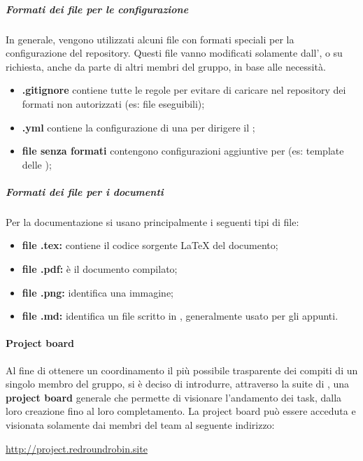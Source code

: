 		\subparagraph{Formati dei file per le configurazione}

		In generale, vengono utilizzati alcuni file con formati speciali per la configurazione del repository. Questi file vanno modificati solamente dall', o su richiesta, anche da parte di altri membri del gruppo, in base alle necessità.
		\begin{itemize}
			\item \textbf{.gitignore} contiene tutte le regole per evitare di caricare nel repository dei formati non autorizzati (es: file eseguibili);
			\item \textbf{.yml} contiene la configurazione di una  per dirigere il ;
			\item \textbf{file senza formati} contengono configurazioni aggiuntive per  (es: template delle );
		\end{itemize}

		\subparagraph{Formati dei file per i documenti}

		Per la documentazione si usano principalmente i seguenti tipi di file:
		\begin{itemize}
			\item \textbf{file .tex:} contiene il codice sorgente \LaTeX{} del documento;
			\item \textbf{file .pdf:} è il documento compilato;
			\item \textbf{file .png:} identifica una immagine;
			\item \textbf{file .md:} identifica un file scritto in , generalmente usato per gli appunti.
		\end{itemize}


	\paragraph{Project board}

	Al fine di ottenere un coordinamento il più possibile trasparente dei compiti di un singolo membro del gruppo, si è deciso di introdurre, attraverso la suite di , una \textbf{project board} generale che permette di visionare l'andamento dei task, dalla loro creazione fino al loro completamento.
	\newline
	La project board può essere acceduta e visionata solamente dai membri del team al seguente indirizzo:

	\href{http://project.redroundrobin.site}{http://project.redroundrobin.site}

